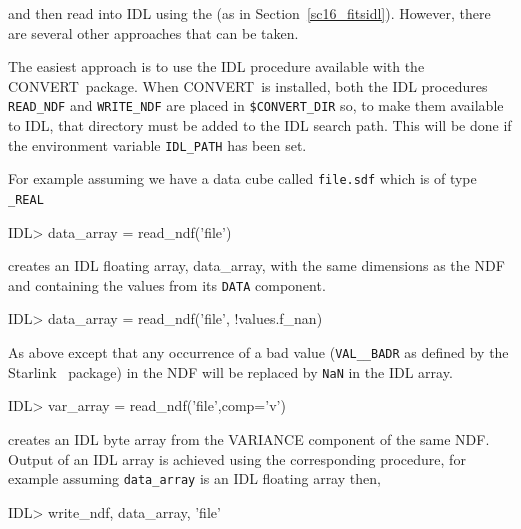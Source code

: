 \documentclass[twoside,11pt]{starlink}
\providecommand{\CONVERT}{{\footnotesize CONVERT}\normalsize}
\begin{document}
and then read into IDL using the  (as
in Section~\ref{sc16_fitsidl}).  However, there are several other
approaches that can be taken.

The easiest approach is to use the  IDL procedure available with the
\CONVERT\ package.  When \CONVERT\ is installed, both the
IDL procedures \texttt{READ\_NDF} and \texttt{WRITE\_NDF} are placed in
\texttt{\$CONVERT\_DIR} so, to make them available to IDL, that directory
must be added to the IDL search path.  This will be done if the
environment variable \texttt{IDL\_PATH} has been set.

For example assuming we have a data cube called \texttt{file.sdf} which is
of type \texttt{\_REAL}

\begin{small}
\begin{terminalv}
IDL> data_array = read_ndf('file')
\end{terminalv}
\end{small}

creates an IDL floating array, data\_array, with the same dimensions
as the NDF and containing the values from its \texttt{DATA} component.

\begin{small}
\begin{terminalv}
IDL> data_array = read_ndf('file', !values.f_nan)
\end{terminalv}
\end{small}

As above except that any occurrence of a bad value (\texttt{VAL\_\_BADR}
as defined by the Starlink \normalsize\ package) in the NDF will be replaced by
\texttt{NaN} in the IDL array.

\begin{small}
\begin{terminalv}
IDL> var_array = read_ndf('file',comp='v')
\end{terminalv}
\end{small}

creates an IDL byte array from the VARIANCE component of the same NDF.
Output of an IDL array is achieved using the corresponding  procedure, for example assuming \texttt{data\_array} is an IDL floating array then,

\begin{small}
\begin{terminalv}
IDL> write_ndf, data_array, 'file'
\end{terminalv}
\end{small}
\end{document}
